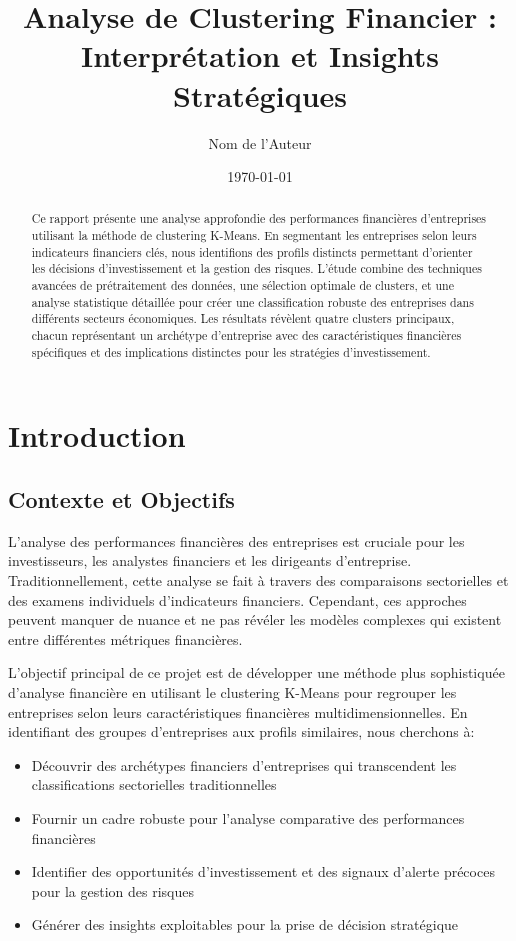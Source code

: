 \documentclass[12pt]{article}
\title{\textbf{\Huge Analyse de Clustering Financier :\\[0.3cm] \Large Interprétation et Insights Stratégiques}}
\author{\Large Nom de l'Auteur}
\date{\today}
\begin{document}
\maketitle

\begin{abstract}
\noindent Ce rapport présente une analyse approfondie des performances financières d'entreprises utilisant la méthode de clustering K-Means. En segmentant les entreprises selon leurs indicateurs financiers clés, nous identifions des profils distincts permettant d'orienter les décisions d'investissement et la gestion des risques. L'étude combine des techniques avancées de prétraitement des données, une sélection optimale de clusters, et une analyse statistique détaillée pour créer une classification robuste des entreprises dans différents secteurs économiques. Les résultats révèlent quatre clusters principaux, chacun représentant un archétype d'entreprise avec des caractéristiques financières spécifiques et des implications distinctes pour les stratégies d'investissement.
\end{abstract}

\tableofcontents
\newpage

\section{Introduction}
\subsection{Contexte et Objectifs}
L'analyse des performances financières des entreprises est cruciale pour les investisseurs, les analystes financiers et les dirigeants d'entreprise. Traditionnellement, cette analyse se fait à travers des comparaisons sectorielles et des examens individuels d'indicateurs financiers. Cependant, ces approches peuvent manquer de nuance et ne pas révéler les modèles complexes qui existent entre différentes métriques financières.

L'objectif principal de ce projet est de développer une méthode plus sophistiquée d'analyse financière en utilisant le clustering K-Means pour regrouper les entreprises selon leurs caractéristiques financières multidimensionnelles. En identifiant des groupes d'entreprises aux profils similaires, nous cherchons à:

\begin{itemize}
    \item Découvrir des archétypes financiers d'entreprises qui transcendent les classifications sectorielles traditionnelles
    \item Fournir un cadre robuste pour l'analyse comparative des performances financières
    \item Identifier des opportunités d'investissement et des signaux d'alerte précoces pour la gestion des risques
    \item Générer des insights exploitables pour la prise de décision stratégique
\end{itemize}
\end{document}
